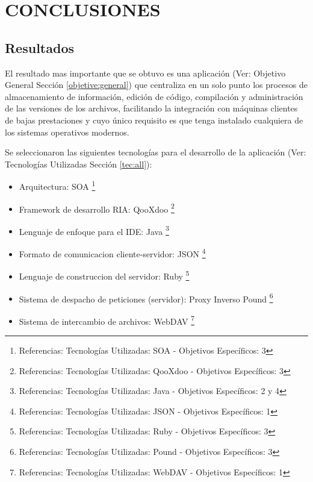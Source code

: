 \section{CONCLUSIONES}

\subsection{Resultados}

El resultado mas importante que se obtuvo es una aplicación (Ver: Objetivo General Sección \ref{objetive:general}) que centraliza en un solo punto los procesos de almacenamiento de información, edición de código, compilación y administración de las versiones de los archivos, facilitando la integración con máquinas clientes de bajas prestaciones y cuyo único requisito es que tenga instalado cualquiera de los sistemas operativos modernos.

Se seleccionaron las siguientes tecnologías para el desarrollo de la aplicación (Ver: Tecnologías Utilizadas Sección \ref{tec:all}):

\begin{itemize}
	
	\item Arquitectura: SOA
	\footnote {Referencias: Tecnologías Utilizadas: SOA - Objetivos Específicos: 3}
	
	\item Framework de desarrollo RIA: QooXdoo
	\footnote {Referencias: Tecnologías Utilizadas: QooXdoo - Objetivos Específicos: 3}
	
	\item Lenguaje de enfoque para el IDE: Java
	\footnote {Referencias: Tecnologías Utilizadas: Java - Objetivos Específicos: 2 y 4}
	
	\item Formato de comunicacion cliente-servidor: JSON
	\footnote {Referencias: Tecnologías Utilizadas: JSON - Objetivos Específicos: 1}
	
	\item Lenguaje de construccion del servidor: Ruby
	\footnote {Referencias: Tecnologías Utilizadas: Ruby - Objetivos Específicos: 3}
	
	\item Sistema de despacho de peticiones (servidor): Proxy Inverso Pound
	\footnote {Referencias: Tecnologías Utilizadas: Pound - Objetivos Específicos: 3}
	
	\item Sistema de intercambio de archivos: WebDAV
	\footnote {Referencias: Tecnologías Utilizadas: WebDAV - Objetivos Específicos: 1}
	
\end{itemize}


